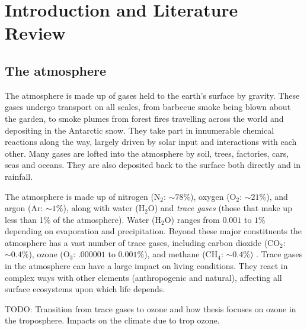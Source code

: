 \chapter{Introduction and Literature Review} %
\label{LR}

\section{The atmosphere}
\label{LR:Atmos}
  The atmosphere is made up of gases held to the earth's surface by gravity. 
  These gases undergo transport on all scales, from barbecue smoke being blown about the garden, to smoke plumes from forest fires travelling across the world and depositing in the Antarctic snow.
  They take part in innumerable chemical reactions along the way, largely driven by solar input and interactions with each other.
  Many gases are lofted into the atmosphere by soil, trees, factories, cars, seas and oceans.
  They are also deposited back to the surface both directly and in rainfall.
  
  The atmosphere is made up of nitrogen (N$_2$: $\sim 78\%$), oxygen (O$_2$: $\sim 21\%$), and argon (Ar: $\sim 1\%$), along with water (H$_2$O) and \textit{trace gases} (those that make up less than 1\% of the atmosphere).
  Water (H$_2$O) ranges from $0.001$ to $1\%$ depending on evaporation and precipitation.
  Beyond these major constituents the atmosphere has a vast number of trace gases, including carbon dioxide (CO$_2$: $\sim 0.4\%$), ozone (O$_3$: $.000001$ to $0.001\%$), and methane (CH$_4$: $\sim 0.4\%$) \parencite[][Ch. 2]{BrasseurJacob2017}.
  Trace gases in the atmosphere can have a large impact on living conditions.
  They react in complex ways with other elements (anthropogenic and natural), affecting all surface ecosystems upon which life depends.
  
  TODO: Transition from trace gases to ozone and how thesis focuses on ozone in the troposphere.
  Impacts on the climate due to trop ozone.
  
